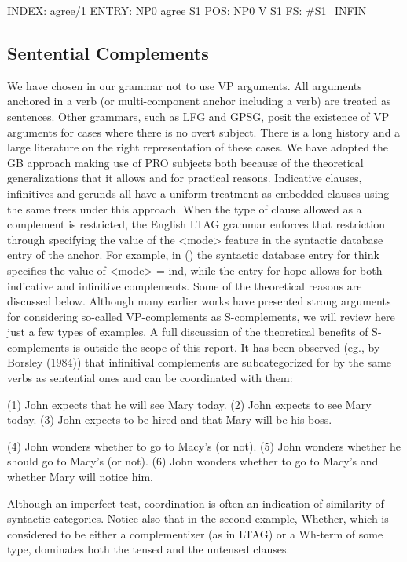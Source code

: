 INDEX:	agree/1
ENTRY:	NP0 agree S1
POS:	NP0 V S1
FS:	#S1_INFIN


 
\subsection{Sentential Complements}
We have chosen in our grammar not to use VP arguments.  All arguments
 anchored in a verb (or multi-component anchor including a verb) are
 treated as sentences.  Other grammars, such as LFG and GPSG, posit
 the existence of VP arguments for cases where there is no overt
 subject.  There is a long history and a large literature on the right
 representation of these cases.  We have adopted the GB approach
 making use of PRO subjects both because of the theoretical
 generalizations that it allows and for practical reasons. Indicative
 clauses, infinitives and gerunds all have a uniform treatment as
 embedded clauses using the same trees under this approach.  When the
 type of clause allowed as a complement is restricted, the English
 LTAG grammar enforces that restriction through specifying the value
 of the <mode> feature in the syntactic database entry of the
 anchor. For example, in () the syntactic database entry for think
 specifies the value of <mode> = ind, while the entry for hope allows
 for both indicative and infinitive complements.  Some of the
 theoretical reasons are discussed below.  Although many earlier works
 have presented strong arguments for considering so-called
 VP-complements as S-complements, we will review here just a few types
 of examples.  A full discussion of the theoretical benefits of
 S-complements is outside the scope of this report.  It has been
 observed (eg., by Borsley (1984)) that infinitival complements are
 subcategorized for by the same verbs as sentential ones and can be
 coordinated with them:

(1)	John expects that he will see Mary today.
(2)	John expects to see Mary today.
(3)	John expects to be hired and that Mary will be his boss.


(4)	John wonders whether to go to Macy's (or not).
(5)	John wonders whether he should go to Macy's (or not).
(6)	John wonders whether to go to Macy's and whether Mary will notice him.

Although an imperfect test, coordination is often an indication of
similarity of syntactic categories.  Notice also that in the second
example, Whether,  which is considered to be either a complementizer (as in LTAG) or a Wh-term of some type, dominates both the tensed and the untensed clauses. 


